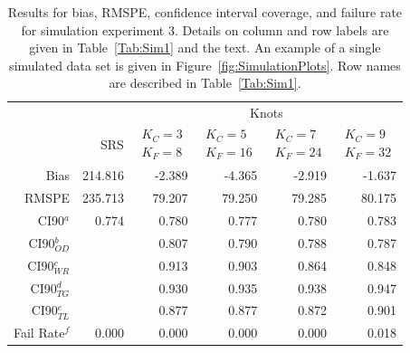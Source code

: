 \documentclass[12pt, titlepage]{article}\usepackage[]{graphicx}\usepackage[]{color}
\begin{document}
\footnotesize
\begin{table}[ht]
\caption{Results for bias, RMSPE, confidence interval coverage, and failure rate for simulation experiment 3. Details on column and row labels are given in Table~\ref{Tab:Sim1} and the text. An example of a single simulated data set is given in Figure~\ref{fig:SimulationPlots}. Row names are described in Table~\ref{Tab:Sim1}. \label{Tab:Sim3}}
\begin{center}
\begin{tabular}{rrrrrr}
  \hline
  \hline
	&  & \multicolumn{4}{c}{Knots} \\ 
 & SRS & $\begin{array}{c}K_C=3  \\ K_F=8 \end{array}$ & $\begin{array}{c}K_C=5  \\ K_F=16 \end{array}$ & $\begin{array}{c}K_C=7  \\ K_F=24 \end{array}$ & $\begin{array}{c}K_C=9  \\ K_F=32 \end{array}$ \\
  \hline
 Bias & 214.816 & -2.389 & -4.365 & -2.919 & -1.637 \\ 
  RMSPE & 235.713 & 79.207 & 79.250 & 79.285 & 80.175 \\ 
  CI90$^a$ & 0.774 & 0.780 & 0.777 & 0.780 & 0.783 \\ 
  CI90$_{OD}^b$ &  & 0.807 & 0.790 & 0.788 & 0.787 \\ 
  CI90$_{WR}^c$ &  & 0.913 & 0.903 & 0.864 & 0.848 \\ 
  CI90$_{TG}^d$ &  & 0.930 & 0.935 & 0.938 & 0.947 \\ 
  CI90$_{TL}^e$ &  & 0.877 & 0.877 & 0.872 & 0.901 \\ 
  Fail Rate$^f$ & 0.000 & 0.000 & 0.000 & 0.000 & 0.018 \\ 
  

   \hline
\end{tabular}
\end{center}
\end{table}

\end{document}
